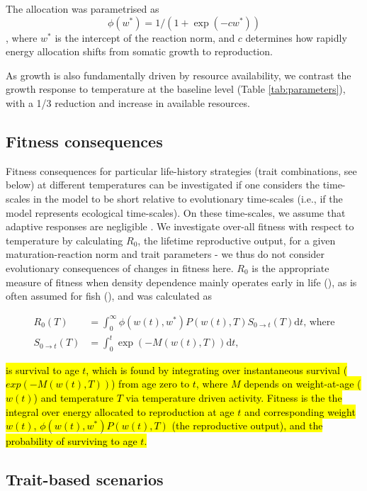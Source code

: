 \documentclass[11pt]{article}\usepackage[]{graphicx}\usepackage[]{color,soul}
\begin{document}
The allocation was parametrised as 
\[ \phi(w^*) = 1/(1+\exp(-cw^*))\],
where $w^*$ is the intercept of the reaction norm, and $c$ determines how rapidly energy allocation shifts from somatic growth to reproduction. 

As growth is also fundamentally driven by resource availability, we contrast the growth response to temperature at the baseline level (Table \ref{tab:parameters}), with a 1/3 reduction and increase in available resources.

\subsection*{Fitness consequences}

Fitness consequences for particular life-history strategies (trait combinations, see below) at different temperatures can be investigated if one considers the time-scales in the model to be short relative to evolutionary time-scales (i.e., if the model represents ecological time-scales). On these time-scales, we assume that adaptive responses are negligible \cite[see, however, ][]{moffett_local_2018, sandblom_plastic_2016}. We investigate over-all fitness with respect to temperature by calculating $R_0$, the lifetime reproductive output, for a given maturation-reaction norm and trait parameters - we thus do not consider evolutionary consequences of changes in fitness here. $R_0$ is the appropriate measure of fitness when density dependence mainly operates early in life (\citealt{kozlowskican2004}), as is often assumed for fish (\citealt{andersenwhen2017, lorenzendensity2018}), and was calculated as 

\begin{align}
R_0(T) &= \int_0^\infty \phi(w(t),w^*)P(w(t),T)S_{0 \rightarrow t}(T) \text{d}t \text{, where} \\
S_{0 \rightarrow t}(T) &= \int_0^t \exp(-M(w(t),T))\text{d}t, 
\end{align}

\hl{is survival to age $t$, which is found by integrating over instantaneous survival ($exp(-M(w(t),T))$) from age zero to $t$, where $M$ depends on weight-at-age ($w(t)$) and temperature $T$ via temperature driven activity. Fitness is the the integral over energy allocated to reproduction at age $t$ and corresponding weight $w(t)$, $\phi(w(t),w^*)P(w(t),T)$ (the reproductive output), and the probability of surviving to age $t$.}

\subsection*{Trait-based scenarios}
\end{document}
